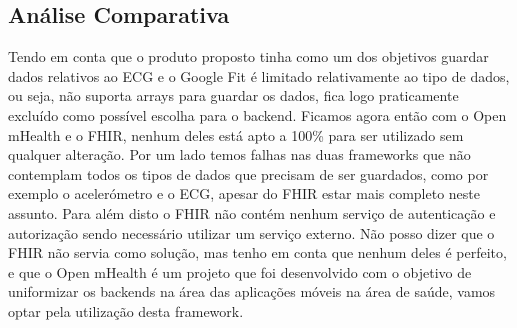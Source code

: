 \subsection{Análise Comparativa}
Tendo em conta que o produto proposto tinha como um dos objetivos guardar dados relativos ao \gls{ECG} e o Google Fit é limitado relativamente ao tipo de dados, ou seja, não suporta arrays para guardar os dados, fica logo praticamente excluído como possível escolha para o backend.
Ficamos agora então com o Open mHealth e o FHIR, nenhum deles está apto a 100\% para ser utilizado sem qualquer alteração. Por um lado temos falhas nas duas frameworks que não contemplam todos os tipos de dados que precisam de ser guardados, como por exemplo o acelerómetro e o \gls{ECG}, apesar do \gls{FHIR} estar mais completo neste assunto.
Para além disto o \gls{FHIR} não contém nenhum serviço de autenticação e autorização sendo necessário utilizar um serviço externo.
Não posso dizer que o \gls{FHIR} não servia como solução, mas tenho em conta que nenhum deles é perfeito, e que o Open mHealth é um projeto que foi desenvolvido com o objetivo de uniformizar os backends na área das aplicações móveis na área de saúde, vamos optar pela utilização desta framework.

\cleardoublepage